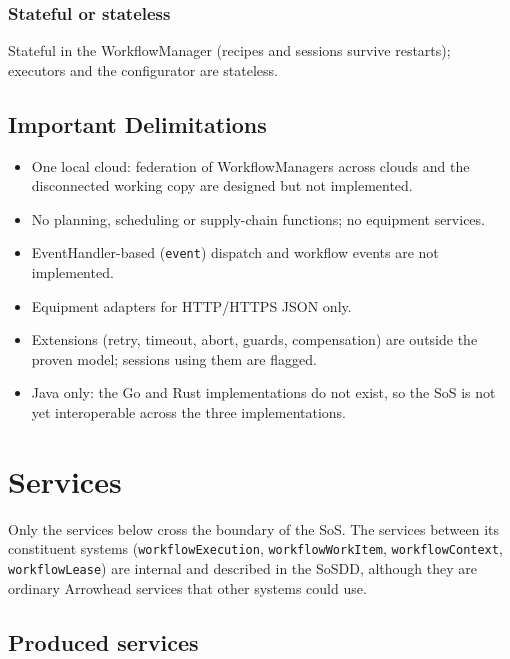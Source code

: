 \documentclass[a4paper]{arrowhead}
\begin{document}
\subsubsection{Stateful or stateless}
Stateful in the WorkflowManager (recipes and sessions survive restarts); executors and the configurator are stateless.

\subsection{Important Delimitations}
\label{sec:delimitations}
\begin{itemize}
\item One local cloud: federation of WorkflowManagers across clouds and the disconnected working copy are designed but
not implemented.
\item No planning, scheduling or supply-chain functions; no equipment services.
\item EventHandler-based (\texttt{event}) dispatch and workflow events are not implemented.
\item Equipment adapters for HTTP/HTTPS JSON only.
\item Extensions (retry, timeout, abort, guards, compensation) are outside the proven model; sessions using them are
flagged.
\item Java only: the Go and Rust implementations do not exist, so the SoS is not yet interoperable across the three
implementations.
\end{itemize}

\newpage
\section{Services}
\label{sec:services}
Only the services below cross the boundary of the SoS. The services between its constituent systems
(\texttt{workflowExecution}, \texttt{workflowWorkItem}, \texttt{workflowContext}, \texttt{workflowLease}) are internal and
described in the SoSDD, although they are ordinary Arrowhead services that other systems could use.

\subsection{Produced services}
\end{document}
